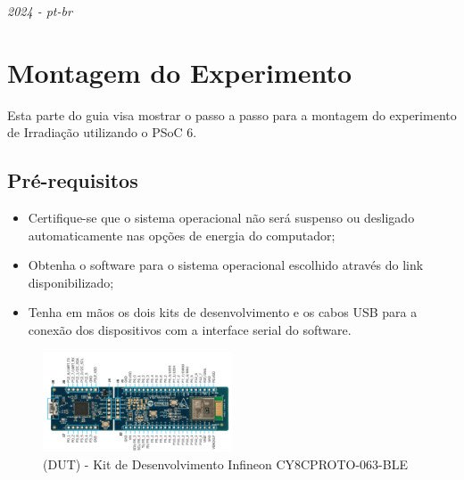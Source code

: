 \documentclass[12pt, a4paper]{article}
\begin{document}
\thispagestyle{empty}

\vspace*{-1.5cm}

\noindent \textit{2024 - pt-br}

\vspace*{14pt}
{
\fontsize{32pt}{24pt}
}
\vspace*{12pt}

\tableofcontents

\section{Montagem do Experimento}

Esta parte do guia visa mostrar o passo a passo para a montagem do experimento de Irradiação utilizando o PSoC 6.

\subsection*{Pré-requisitos}

\begin{itemize}[leftmargin=1.3cm]
    \item Certifique-se que o sistema operacional não será suspenso ou desligado automaticamente nas opções de energia do computador;
    \item Obtenha o software  para o sistema operacional escolhido através do link disponibilizado;
    \item Tenha em mãos os dois kits de desenvolvimento e os cabos USB para a conexão dos dispositivos com a interface serial do software.
\end{itemize}

\begin{figure}[H]
    \centering
    \caption{(DUT) - Kit de Desenvolvimento Infineon CY8CPROTO-063-BLE}
    \includegraphics[width=0.5\textwidth]{../imgs/psoc63_DUT.png}

    \vspace{0.5em}
    \label{fig:psoc6}
\end{figure}
\end{document}
